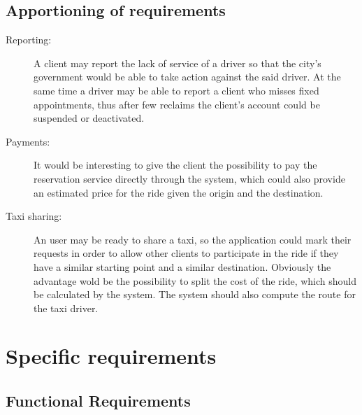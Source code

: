 \documentclass[a4paper]{article}
\let\stdsection\section
\renewcommand\section{\newpage\stdsection}
\begin{document}
\subsection{Apportioning of requirements}
\begin{description}
\item[Reporting:] A client may report the lack of service of a driver so that the city's government would be able to take action against the said driver. At the same time a driver may be able to report a client who misses fixed appointments, thus after few reclaims the client's account could be suspended or deactivated. 
\item[Payments:] It would be interesting to give the client the possibility to pay the reservation service directly through the system, which could also provide an estimated price for the ride given the origin and the destination.
\item[Taxi sharing:] An user may be ready to share a taxi, so the application could mark their requests in order to allow other clients to participate in the ride if they have a similar starting point and a similar destination. Obviously the advantage wold be the possibility to split the cost of the ride, which should be calculated by the system. The system should also compute the route for the taxi driver.
\end{description}

\section{Specific requirements}

\subsection{Functional Requirements}
\end{document}
